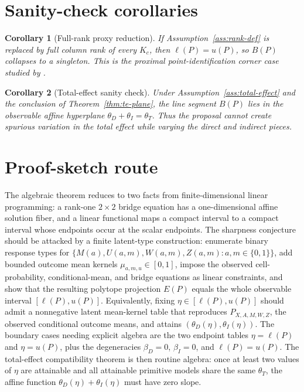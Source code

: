 \documentclass[11pt]{article}
\theoremstyle{definition}
\theoremstyle{plain}
\newtheorem{corollary}{Corollary}
\theoremstyle{remark}
\begin{document}
\section{Sanity-check corollaries}
\begin{corollary}[Full-rank proxy reduction]\label{cor:full-rank}
If Assumption~\ref{ass:rank-def} is replaced by full column rank of every
\(K_c\), then \(\ell(P)=u(P)\), so \(B(P)\) collapses to a singleton.  This is
the proximal point-identification corner case studied by
\citet{DukesShpitserTchetgen2023}.
\end{corollary}

\begin{corollary}[Total-effect sanity check]\label{cor:te}
Under Assumption~\ref{ass:total-effect} and the conclusion of
Theorem~\ref{thm:te-plane}, the line segment \(B(P)\) lies in the observable
affine hyperplane \(\theta_D+\theta_I=\theta_T\).  Thus the
proposal cannot create spurious variation in the total effect while varying
the direct and indirect pieces.
\end{corollary}

\section{Proof-sketch route}
The algebraic theorem reduces to two facts from finite-dimensional linear
programming: a rank-one \(2\times2\) bridge equation has a one-dimensional
affine solution fiber, and a linear functional maps a compact interval to a
compact interval whose endpoints occur at the scalar endpoints.  The sharpness
conjecture should be attacked by a finite latent-type construction: enumerate
binary response types for
\(\{M(a),U(a,m),W(a,m),Z(a,m):a,m\in\{0,1\}\}\), add bounded outcome mean
kernels \(\mu_{a,m,u}\in[0,1]\), impose the observed cell-probability,
conditional-mean, and bridge equations as linear constraints, and show that
the resulting polytope projection \(E(P)\) equals the whole observable interval
\([\ell(P),u(P)]\).  Equivalently, fixing
\(\eta\in[\ell(P),u(P)]\) should admit a nonnegative latent mean-kernel table
that reproduces \(P_{X,A,M,W,Z}\), the observed conditional outcome means, and
attains \((\theta_D(\eta),\theta_I(\eta))\).  The boundary cases needing
explicit algebra are the two endpoint tables
\(\eta=\ell(P)\) and \(\eta=u(P)\), plus the degeneracies \(\beta_D=0\),
\(\beta_I=0\), and \(\ell(P)=u(P)\).  The total-effect compatibility theorem
is then routine algebra: once at least two values of \(\eta\) are attainable
and all attainable primitive models share the same \(\theta_T\), the affine
function \(\theta_D(\eta)+\theta_I(\eta)\) must have zero slope.
\end{document}
